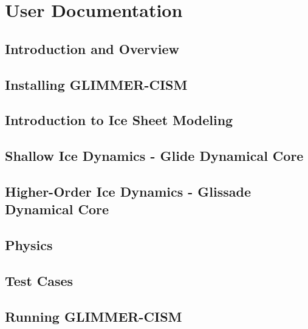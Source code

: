 \mainmatter
\part{User Documentation}

\chapter{Introduction and Overview}
\newcommand{\dir}{intro}


\chapter{Installing GLIMMER-CISM}
\renewcommand{\dir}{install}


\chapter{Introduction to Ice Sheet Modeling}
\renewcommand{\dir}{modeling-intro}


\chapter{Shallow Ice Dynamics - Glide Dynamical Core}
\renewcommand{\dir}{shallow-ice}


\chapter{Higher-Order Ice Dynamics - Glissade Dynamical Core}
\renewcommand{\dir}{higher-order}


\chapter{Physics}
\renewcommand{\dir}{physics}


\chapter{Test Cases}
\label{sec:testcases}
\renewcommand{\dir}{tests}


\chapter{Running GLIMMER-CISM}
\renewcommand{\dir}{run_cism}


